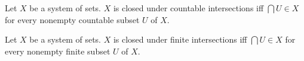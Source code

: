 \documentclass[10pt]{article}
\begin{document}
  \begin{forthel}
    \begin{definition}
      Let $X$ be a system of sets.
      $X$ is closed under countable intersections iff $\bigcap U \in X$ for
      every nonempty countable subset $U$ of $X$.
    \end{definition}
  \end{forthel}

  \begin{forthel}
    \begin{definition}
      Let $X$ be a system of sets.
      $X$ is closed under finite intersections iff $\bigcap U \in X$ for every
      nonempty finite subset $U$ of $X$.
    \end{definition}
  \end{forthel}
\end{document}
